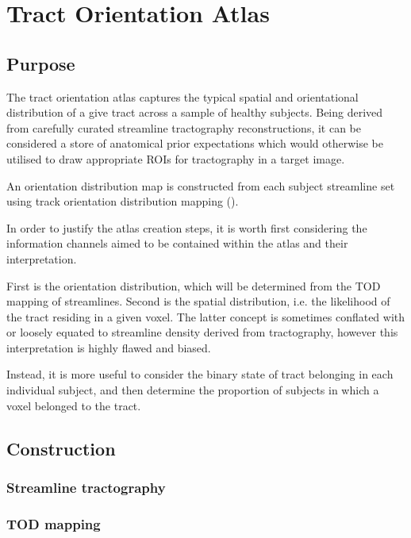 \chapter{Tract Orientation Atlas}
\label{chapterlabel2}


\section{Purpose}


The tract orientation atlas captures the typical spatial and orientational distribution of a give tract across a sample of healthy subjects. Being derived from carefully curated streamline tractography reconstructions, it can be considered a store of anatomical prior expectations which would otherwise be utilised to draw appropriate ROIs for tractography in a target image.


An orientation distribution map is constructed from each subject streamline set using track orientation distribution mapping ().\autocite{Dhollander2014}

In order to justify the atlas creation steps, it is worth first considering the information channels aimed to be contained within the atlas and their interpretation.

First is the orientation distribution, which will be determined from the TOD mapping of streamlines.
Second is the spatial distribution, i.e. the likelihood of the tract residing in a given voxel.
The latter concept is sometimes conflated with or loosely equated to streamline density derived from tractography, however this interpretation is highly flawed and biased.

Instead, it is more useful to consider the binary state of tract belonging in each individual subject, and then determine the proportion of subjects in which a voxel belonged to the tract.

\section{Construction}


\subsection{Streamline tractography}


\subsection{TOD mapping}

